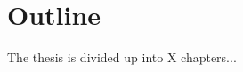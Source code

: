 \documentclass[../thesis.tex]{subfiles}
\begin{document}
\section{Outline}
The thesis is divided up into X chapters...



\end{document}
